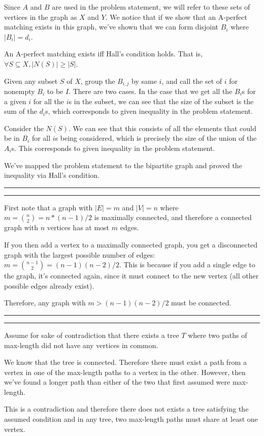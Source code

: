 \documentclass[11pt,letterpaper]{article}
\newcommand{\question}[1] {\vspace{.25in} \hrule\vspace{0.5em}
\noindent{\bf #1} \vspace{0.5em}
\hrule \vspace{.10in}}
\begin{document}
Since $A$ and $B$ are used in the problem statement, we will refer to these sets of vertices in the graph as $X$ and $Y$.
We notice that if we show that an A-perfect matching exists in this graph, we've shown that we can form disjoint $B_i$ where $|B_i| = d_i$.

An A-perfect matching exists iff Hall's condition holds. That is, $\forall S \subseteq X, |N(S)| \geq |S|$.

Given any subset $S$ of $X$, group the $B_{i,j}$ by same $i$, and call the set of $i$ for nonempty $B_i$ to be $I$.
There are two cases. In the case that we get all the $B_i$s for a given $i$ for all the $i$s in the subset,
we can see that the size of the subset is the sum of the $d_i$s, which corresponds to given inequality in the problem statement.

Consider the $N(S)$. We can see that this consists of all the elements that could be in $B_i$ for all $i$s being considered,
which is precisely the size of the union of the $A_i$s. This corresponds to given inequality in the problem statement.

We've mapped the problem statement to the bipartite graph and proved the inequality via Hall's condition.


\question{3}
First note that a graph with $|E| = m$ and $|V| = n$ where $m = {n \choose 2} = n*(n - 1)/2$ is maximally connected, and therefore a connected graph with $n$ vertices has at most $m$ edges.

If you then add a vertex to a maximally connected graph, you get a disconnected graph with the largest possible number of edges: $m = {n-1 \choose 2} = (n-1)(n-2)/2$.
This is because if you add a single edge to the graph, it's connected again, since it must connect to the new vertex (all other possible edges already exist).

Therefore, any graph with $m > (n-1)(n-2)/2$ must be connected.

\question{4}
Assume for sake of contradiction that there exists a tree $T$ where two paths of max-length did not have any vertices in common.

We know that the tree is connected.
Therefore there must exist a path from a vertex in one of the max-length paths to a vertex in the other.
However, then we've found a longer path than either of the two that first assumed were max-length.

This is a contradiction and therefore there does not exists a tree satisfying the assumed condition and in any tree, two max-length paths must share at least one vertex.
\end{document}
